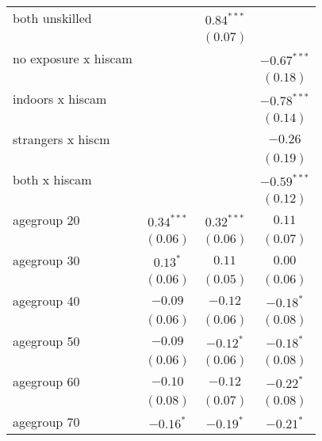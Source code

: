 \begin{table}
\begin{center}
\begin{tabular}{l c c c}
both unskilled                   &               & $0.84^{***}$  &               \\
                                 &               & $(0.07)$      &               \\
no exposure x hiscam             &               &               & $-0.67^{***}$ \\
                                 &               &               & $(0.18)$      \\
indoors x hiscam                 &               &               & $-0.78^{***}$ \\
                                 &               &               & $(0.14)$      \\
strangers x hiscm                &               &               & $-0.26$       \\
                                 &               &               & $(0.19)$      \\
both x hiscam                    &               &               & $-0.59^{***}$ \\
                                 &               &               & $(0.12)$      \\
agegroup 20                      & $0.34^{***}$  & $0.32^{***}$  & $0.11$        \\
                                 & $(0.06)$      & $(0.06)$      & $(0.07)$      \\
agegroup 30                      & $0.13^{*}$    & $0.11$        & $0.00$        \\
                                 & $(0.06)$      & $(0.05)$      & $(0.06)$      \\
agegroup 40                      & $-0.09$       & $-0.12$       & $-0.18^{*}$   \\
                                 & $(0.06)$      & $(0.06)$      & $(0.08)$      \\
agegroup 50                      & $-0.09$       & $-0.12^{*}$   & $-0.18^{*}$   \\
                                 & $(0.06)$      & $(0.06)$      & $(0.08)$      \\
agegroup 60                      & $-0.10$       & $-0.12$       & $-0.22^{*}$   \\
                                 & $(0.08)$      & $(0.07)$      & $(0.08)$      \\
agegroup 70                      & $-0.16^{*}$   & $-0.19^{*}$   & $-0.21^{*}$   \\

\end{tabular}
\end{center}
\end{table}
